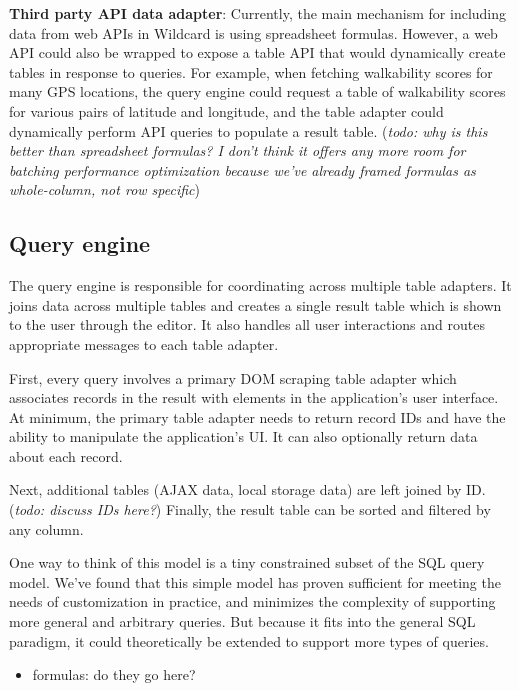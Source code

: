 \documentclass[sigplan,10pt,anonymous,review]{acmart}
\providecommand{\tightlist}{%
  \setlength{\itemsep}{0pt}\setlength{\parskip}{0pt}}
\begin{document}
\textbf{Third party API data adapter}: Currently, the main mechanism for
including data from web APIs in Wildcard is using spreadsheet formulas.
However, a web API could also be wrapped to expose a table API that
would dynamically create tables in response to queries. For example,
when fetching walkability scores for many GPS locations, the query
engine could request a table of walkability scores for various pairs of
latitude and longitude, and the table adapter could dynamically perform
API queries to populate a result table. (\emph{todo: why is this better
than spreadsheet formulas? I don't think it offers any more room for
batching performance optimization because we've already framed formulas
as whole-column, not row specific})

\hypertarget{query-engine}{%
\subsection{Query engine}\label{query-engine}}

The query engine is responsible for coordinating across multiple table
adapters. It joins data across multiple tables and creates a single
result table which is shown to the user through the editor. It also
handles all user interactions and routes appropriate messages to each
table adapter.

First, every query involves a primary DOM scraping table adapter which
associates records in the result with elements in the application's user
interface. At minimum, the primary table adapter needs to return record
IDs and have the ability to manipulate the application's UI. It can also
optionally return data about each record.

Next, additional tables (AJAX data, local storage data) are left joined
by ID. (\emph{todo: discuss IDs here?}) Finally, the result table can be
sorted and filtered by any column.

One way to think of this model is a tiny constrained subset of the SQL
query model. We've found that this simple model has proven sufficient
for meeting the needs of customization in practice, and minimizes the
complexity of supporting more general and arbitrary queries. But because
it fits into the general SQL paradigm, it could theoretically be
extended to support more types of queries.

\begin{itemize}
\tightlist
\item
  formulas: do they go here?
\end{itemize}
\end{document}
